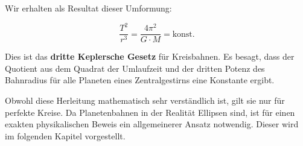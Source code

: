Wir erhalten als Resultat dieser Umformung:

\begin{equation}
    \frac{T^2}{r^3}
    = \frac{4\pi^2}{G \cdot M}
    = \text{konst.}
\end{equation}

Dies ist das \textbf{dritte Keplersche Gesetz} für Kreisbahnen.
Es besagt, dass der Quotient aus dem Quadrat der Umlaufzeit und der dritten Potenz des Bahnradius für alle Planeten eines Zentralgestirns eine Konstante ergibt.

Obwohl diese Herleitung mathematisch sehr verständlich ist, gilt sie nur für perfekte Kreise.
Da Planetenbahnen in der Realität Ellipsen sind, ist für einen exakten physikalischen Beweis ein allgemeinerer Ansatz notwendig.
Dieser wird im folgenden Kapitel vorgestellt.

